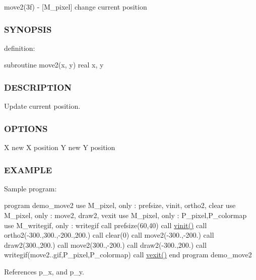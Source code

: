 move2(3f) -\/ \mbox{[}M\+\_\+pixel\mbox{]} change current position 

\subsubsection*{S\+Y\+N\+O\+P\+S\+IS}

definition\+:

subroutine move2(x, y) real x, y

\subsubsection*{D\+E\+S\+C\+R\+I\+P\+T\+I\+ON}

Update current position.

\subsubsection*{O\+P\+T\+I\+O\+NS}

X new X position Y new Y position

\subsubsection*{E\+X\+A\+M\+P\+LE}

Sample program\+:

program demo\+\_\+move2 use M\+\_\+pixel, only \+: prefsize, vinit, ortho2, clear use M\+\_\+pixel, only \+: move2, draw2, vexit use M\+\_\+pixel, only \+: P\+\_\+pixel,P\+\_\+colormap use M\+\_\+writegif, only \+: writegif call prefsize(60,40) call \hyperlink{namespacem__pixel_ac03ca8f23fdadb60599b6ea4dc87a6d9}{vinit()} call ortho2(-\/300.,300.,-\/200.,200.) call clear(0) call move2(-\/300.,-\/200.) call draw2(300.,200.) call move2(300.,-\/200.) call draw2(-\/300.,200.) call writegif(\textquotesingle{}move2..\+gif\textquotesingle{},P\+\_\+pixel,P\+\_\+colormap) call \hyperlink{namespacem__pixel_a19ad6b65752322b0029a62cc0ebec3e8}{vexit()} end program demo\+\_\+move2 

References p\+\_\+x, and p\+\_\+y.

\mbox{\label{namespacem__pixel_a80dece6adac704024a5a76efee697770}} 
